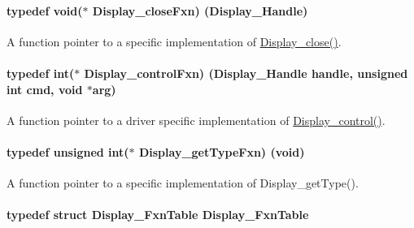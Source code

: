 \paragraph[{Display\+\_\+close\+Fxn}]{\setlength{\rightskip}{0pt plus 5cm}typedef void($\ast$ Display\+\_\+close\+Fxn) ({\bf Display\+\_\+\+Handle})}\label{_display_8h_ade8c953094781efff0f10ee0696a984f}


A function pointer to a specific implementation of \hyperlink{_display_8h_aea13e4e023f2b8020bed2e888cf98599}{Display\+\_\+close()}. 

\paragraph[{Display\+\_\+control\+Fxn}]{\setlength{\rightskip}{0pt plus 5cm}typedef int($\ast$ Display\+\_\+control\+Fxn) ({\bf Display\+\_\+\+Handle} handle, unsigned int cmd, void $\ast$arg)}\label{_display_8h_a67b559ffeebd829633512c4381858cc1}


A function pointer to a driver specific implementation of \hyperlink{_display_8h_ad623d21e3c6d821bf6f4bdcfa05ec21f}{Display\+\_\+control()}. 

\paragraph[{Display\+\_\+get\+Type\+Fxn}]{\setlength{\rightskip}{0pt plus 5cm}typedef unsigned int($\ast$ Display\+\_\+get\+Type\+Fxn) (void)}\label{_display_8h_a2800d49b89aa7e3d9a2ec758d60358f1}


A function pointer to a specific implementation of Display\+\_\+get\+Type(). 

\paragraph[{Display\+\_\+\+Fxn\+Table}]{\setlength{\rightskip}{0pt plus 5cm}typedef struct {\bf Display\+\_\+\+Fxn\+Table}  {\bf Display\+\_\+\+Fxn\+Table}}\label{_display_8h_abdb33c07acce5b6e5affae6725331399}


